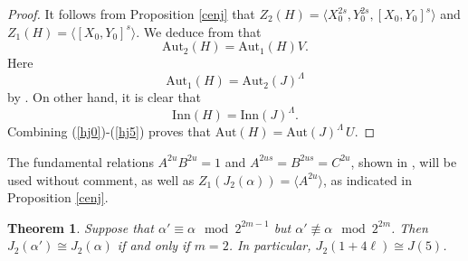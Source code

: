 \documentclass{amsart}
\newtheorem{theorem}{Theorem}[section]
\theoremstyle{definition}
\theoremstyle{remark}
\begin{document}
\begin{proof}
It follows from Proposition \ref{cenj} that $Z_2(H)=\langle X_0^{2s}, Y_0^{2s}, [X_0,Y_0]^s\rangle$ and
$Z_1(H)=\langle [X_0,Y_0]^s\rangle$. We deduce from \cite[Proposition 6.6]{MS3} that
\begin{equation}\label{hj3}
\mathrm{Aut}_2(H)=\mathrm{Aut}_1(H)V.
\end{equation}
Here
\begin{equation}\label{hj4}
\mathrm{Aut}_1(H)=\mathrm{Aut}_2(J)^\Lambda
\end{equation}
by \cite[Proposition 7.2]{MS3}. On other hand, it is clear that
\begin{equation}\label{hj5}
\mathrm{Inn}(H)=\mathrm{Inn}(J)^\Lambda.
\end{equation}
Combining (\ref{hj0})-(\ref{hj5}) proves that $\mathrm{Aut}(H)=\mathrm{Aut}(J)^\Lambda\, U$.
\end{proof}

The fundamental relations $A^{2u}B^{2u}=1$ and
$A^{2us}=B^{2us}=C^{2u}$, shown in \cite[Section 6]{MS}, will be used without comment,
as well as $Z_1(J_2(\alpha))=\langle A^{2u}\rangle$, as indicated in Proposition \ref{cenj}.

\begin{theorem}\label{necj2} Suppose that $\alpha'\equiv\alpha\mod 2^{2m-1}$ but
$\alpha'\not\equiv\alpha\mod 2^{2m}$. Then $J_2(\alpha')\cong J_2(\alpha)$ if and only if $m=2$.
In particular, $J_2(1+4\ell)\cong J(5)$.
\end{theorem}
\end{document}
